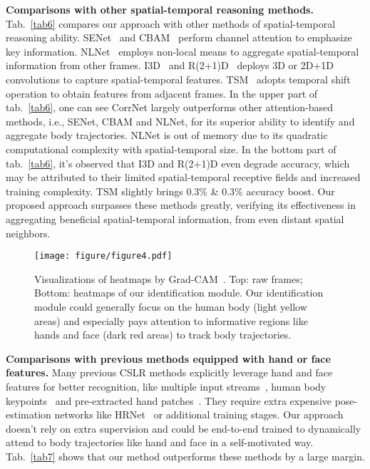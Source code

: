 \documentclass[10pt,twocolumn,letterpaper]{article}
\begin{document}
\textbf{Comparisons with other spatial-temporal reasoning methods.} 
Tab.~\ref{tab6} compares our approach with other methods of spatial-temporal reasoning ability. SENet~\cite{hu2018squeeze} and CBAM~\cite{woo2018cbam} perform channel attention to emphasize key information. NLNet~\cite{wang2018non} employs non-local means to aggregate spatial-temporal information from other frames. I3D~\cite{carreira2017quo} and R(2+1)D~\cite{tran2018closer} deploys 3D or 2D+1D convolutions to capture spatial-temporal features. TSM~\cite{lin2019tsm} adopts temporal shift operation to obtain features from adjacent frames. In the upper part of tab.~\ref{tab6}, one can see CorrNet largely outperforms other attention-based methods, i.e., SENet, CBAM and NLNet, for its superior ability to identify and aggregate body trajectories. NLNet is out of memory due to its quadratic computational complexity with spatial-temporal size. In the bottom part of tab.~\ref{tab6}, it's observed that I3D and R(2+1)D even degrade accuracy, which may be attributed to their limited spatial-temporal receptive fields and increased training complexity. TSM slightly brings 0.3\% \& 0.3\% accuracy boost. Our proposed approach surpasses these methods greatly, verifying its effectiveness in aggregating beneficial spatial-temporal information, from even distant spatial neighbors. 

\begin{figure}[t]
  \centering
  \texttt{[image: figure/figure4.pdf]}
  \caption{Visualizations of heatmaps by Grad-CAM~\cite{selvaraju2017grad}. Top: raw frames; Bottom: heatmaps of our identification module. Our identification module could generally focus on the human body (light yellow areas) and especially pays attention to informative regions like hands and face (dark red areas) to track body trajectories.}
  \label{fig5}
  \end{figure} 

\textbf{Comparisons with previous methods equipped with hand or face features.} Many previous CSLR methods explicitly leverage hand and face features for better recognition, like multiple input streams~\cite{koller2019weakly}, human body keypoints~\cite{zhou2020spatial,zuo2022c2slr} and pre-extracted hand patches~\cite{cui2019deep}. They require extra expensive pose-estimation networks like HRNet~\cite{wang2020deep} or additional training stages. Our approach doesn't rely on extra supervision and could be end-to-end trained to dynamically attend to body trajectories like hand and face in a self-motivated way. Tab.~\ref{tab7} shows that our method outperforms these methods by a large margin.
\end{document}
